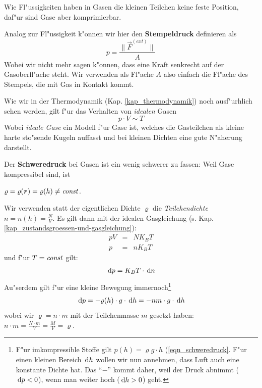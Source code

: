 Wie Fl"ussigkeiten haben in Gasen die kleinen Teilchen keine feste
Position, daf"ur sind Gase aber komprimierbar.

Analog zur Fl"ussigkeit k"onnen wir hier den \textbf{Stempeldruck} definieren als
\begin{equation}
   \label{eq:63}
   p = \frac{\|\vec F^{(ext)}\|}{A}
\end{equation}
Wobei wir nicht mehr sagen k"onnen, dass eine Kraft senkrecht auf der
Gasoberfl"ache steht. Wir verwenden als Fl"ache $A$ also einfach die
Fl"ache des Stempels, die mit Gas in Kontakt kommt.

Wie wir in der Thermodynamik (Kap. \ref{kap_thermodynamik}) noch
ausf"urhlich sehen werden, gilt f"ur das Verhalten von \emph{idealen} Gasen
\begin{equation*}
   p \cdot V \sim T
\end{equation*}
Wobei \emph{ideale Gase} ein Modell f"ur Gase ist, welches die
Gasteilchen als kleine harte sto"sende Kugeln auffasst und bei kleinen
Dichten eine gute N"aherung darstellt.

\bigskip

Der \textbf{Schweredruck} bei Gasen ist ein wenig schwerer zu fassen:
Weil Gase kompressibel sind, ist 
\begin{Wichtig}
   $\varrho = \varrho(\boldsymbol{r}) = \varrho(h) \neq \text{\emph{const}}$.
\end{Wichtig}
Wir verwenden statt der eigentlichen Dichte $\varrho$ die
\emph{Teilchendichte} $n = n(h) =
\frac{N}{V}$. Es gilt dann mit der idealen Gasgleichung
(s. Kap. \ref{kap_zustandsgroessen-und-gasgleichung}):
\begin{eqnarray}
   \label{eq:64}
\nonumber
   pV &=& NK_BT \\
\nonumber
   p &=& nK_BT
\end{eqnarray}
und f"ur $T = \text{\emph{const}}$ gilt:
\begin{equation}
   \label{eq:65}
\, \mathrm{d} p = K_B T \cdot \, \mathrm{d} n   
\end{equation}
Au"serdem gilt f"ur eine kleine Bewegung immernoch\footnote{F"ur
  imkompressible Stoffe gilt $p(h) = \varrho g \cdot h$
  (\ref{eqn_schweredruck}. F"ur einen kleinen Bereich $\, \mathrm{d} h$ wollen
  wir nun annehmen, dass Luft auch eine konstante Dichte hat. Das
  "`$-$"' kommt daher, weil der Druck abnimmt ($\, \mathrm{d} p < 0$), wenn
  man weiter hoch ($\, \mathrm{d} h > 0$) geht.}
\begin{equation}
   \label{eq:66}
   \, \mathrm{d} p  = -\varrho(h) \cdot g \cdot \, \mathrm{d} h = -nm \cdot g \cdot
   \, \mathrm{d} h
\end{equation}
wobei wir $\varrho = n \cdot m$ mit der Teilchenmasse $m$ gesetzt
haben: $n \cdot m = \frac{N \cdot m}{V} = \frac{M}{V} = \varrho$.

